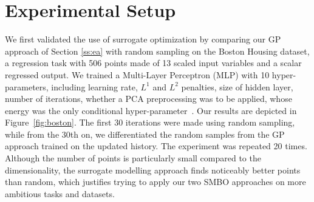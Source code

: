 \documentclass{article}
\newcommand{\vs}[1]{\vspace*{-#1mm}}
\newcommand{\as}{\vs{1}}
\newcommand{\ass}{\vs{0.7}}
\begin{document}
\section{Experimental Setup}
\label{sec:exp}
We first validated the use of surrogate optimization by comparing our
GP approach of Section \ref{ss:ea} with random sampling on the Boston
Housing dataset, a regression task with 506 points made of 13 scaled
input variables and a scalar regressed output. We trained a
Multi-Layer Perceptron (MLP) with 10 hyper-parameters,
including learning rate, $L^1$ and $L^2$ penalties, size of hidden
layer, number of iterations, whether a PCA preprocessing was to be
applied, whose energy was the only conditional hyper-parameter~\citep{Bis95}. Our
results are depicted in Figure~\ref{fig:boston}. The first 30 iterations
were made using random sampling, while from the 30th on, we
differentiated the random samples from the GP approach trained on the
updated history. The experiment was repeated 20 times. Although the
number of points is particularly small compared to the dimensionality,
the surrogate modelling approach finds noticeably better points than
random, which justifies trying to apply our two SMBO approaches on
more ambitious tasks and datasets. 
\end{document}
